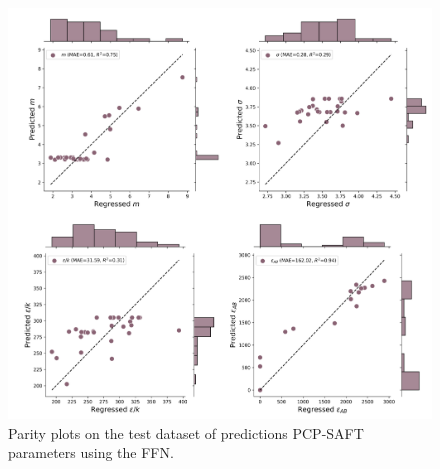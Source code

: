 \begin{figure}
    \centering
    \includegraphics[width=\textwidth]{gfx/Chapter08/ffn_parity_plots.png}
    \caption{Parity plots on the test dataset of predictions PCP-SAFT parameters using the FFN.}
    \label{fig:ffn}
\end{figure}